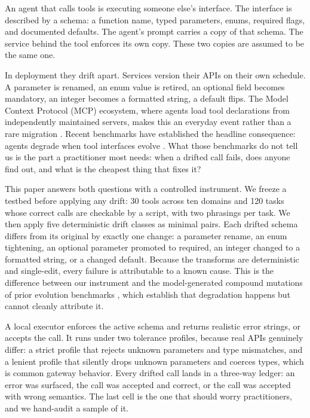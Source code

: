 An agent that calls tools is executing someone else's interface. The interface is described by a schema: a function name, typed parameters, enums, required flags, and documented defaults. The agent's prompt carries a copy of that schema. The service behind the tool enforces its own copy. These two copies are assumed to be the same one.

In deployment they drift apart. Services version their APIs on their own schedule. A parameter is renamed, an enum value is retired, an optional field becomes mandatory, an integer becomes a formatted string, a default flips. The Model Context Protocol (MCP) ecosystem, where agents load tool declarations from independently maintained servers, makes this an everyday event rather than a rare migration \citep{mcpfaults}. Recent benchmarks have established the headline consequence: agents degrade when tool interfaces evolve \citep{mcpevol, toolbenchx, proevolve}. What those benchmarks do not tell us is the part a practitioner most needs: when a drifted call fails, does anyone find out, and what is the cheapest thing that fixes it?

This paper answers both questions with a controlled instrument. We freeze a testbed before applying any drift: 30 tools across ten domains and 120 tasks whose correct calls are checkable by a script, with two phrasings per task. We then apply five deterministic drift classes as minimal pairs. Each drifted schema differs from its original by exactly one change: a parameter rename, an enum tightening, an optional parameter promoted to required, an integer changed to a formatted string, or a changed default. Because the transforms are deterministic and single-edit, every failure is attributable to a known cause. This is the difference between our instrument and the model-generated compound mutations of prior evolution benchmarks \citep{mcpevol, toolbenchx}, which establish that degradation happens but cannot cleanly attribute it.

A local executor enforces the active schema and returns realistic error strings, or accepts the call. It runs under two tolerance profiles, because real APIs genuinely differ: a strict profile that rejects unknown parameters and type mismatches, and a lenient profile that silently drops unknown parameters and coerces types, which is common gateway behavior. Every drifted call lands in a three-way ledger: an error was surfaced, the call was accepted and correct, or the call was accepted with wrong semantics. The last cell is the one that should worry practitioners, and we hand-audit a sample of it.

